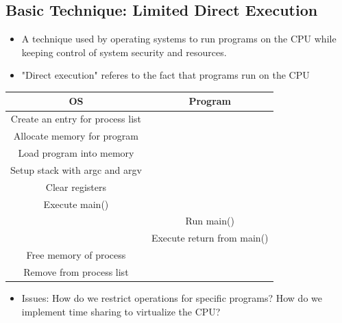 \documentclass[11pt, a4paper]{article}
\theoremstyle{definition}
\theoremstyle{remark}
\begin{document}
\subsection{Basic Technique: Limited Direct Execution}
\begin{itemize}
  \item A technique used by operating systems to run programs on the CPU while keeping control of system security and resources.
  \item "Direct execution" referes to the fact that programs run on the CPU 
\end{itemize}
\begin{center}
\begin{tabular}{c c}
\textbf{OS} & \textbf{Program} \\
\hline
Create an entry for process list & \\
Allocate memory for program & \\ 
Load program into memory & \\ 
Setup stack with argc and argv & \\ 
Clear registers & \\ 
Execute main() & \\
& Run main() \\
& Execute return from main() \\ 
Free memory of process & \\ 
Remove from process list & \\
\end{tabular}
\end{center}
\begin{itemize}
  \item Issues: How do we restrict operations for specific programs? How do we implement time sharing to virtualize the CPU?
\end{itemize}
\end{document}
